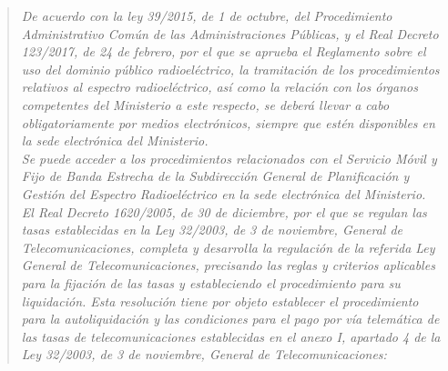 \begin{quote}
\itshape
De acuerdo con la ley 39/2015, de 1 de octubre, del Procedimiento Administrativo Común de las Administraciones Públicas, y el Real Decreto 123/2017, de 24 de febrero, por el que se aprueba el Reglamento sobre el uso del dominio público radioeléctrico, la tramitación de los procedimientos relativos al espectro radioeléctrico, así como la relación con los órganos competentes del Ministerio a este respecto, se deberá llevar a cabo obligatoriamente por medios electrónicos, siempre que estén disponibles en la sede electrónica del Ministerio.\\
Se puede acceder a los procedimientos relacionados con el Servicio Móvil y Fijo de Banda Estrecha de la Subdirección General de Planificación y Gestión del Espectro Radioeléctrico en la sede electrónica del Ministerio.\\

El Real Decreto 1620/2005, de 30 de diciembre, por el que se regulan las tasas establecidas en la Ley 32/2003, de 3 de noviembre, General de Telecomunicaciones, completa y desarrolla la regulación de la referida Ley General de Telecomunicaciones, precisando las reglas y criterios aplicables para la fijación de las tasas y estableciendo el procedimiento para su liquidación. Esta resolución tiene por objeto establecer el procedimiento para la autoliquidación y las condiciones para el pago por vía telemática de las tasas de telecomunicaciones establecidas en el anexo I, apartado 4 de la Ley 32/2003, de 3 de noviembre, General de Telecomunicaciones:
\end{quote}


